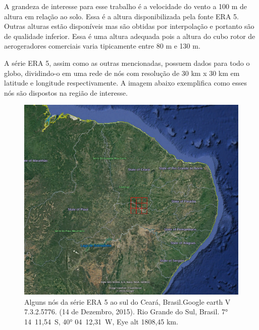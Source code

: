 \documentclass[
	12pt,				%
	openright,			%
	oneside,			%
	a4paper,			%
	english,			%
	french,				%
	spanish,			%
	brazil				%
	]{abntex2}
\begin{document}
A grandeza de interesse para esse trabalho é a velocidade do vento a 100 m de altura em relação ao solo. Essa é a altura disponibilizada pela fonte ERA 5. Outras alturas estão disponíveis mas são obtidas por interpolação e portanto são de qualidade inferior. Essa é uma altura adequada pois a altura do cubo rotor de aerogeradores comerciais varia tipicamente entre 80 m e 130 m. 


A série ERA 5, assim como as outras mencionadas, possuem dados para todo o globo, dividindo-o em uma rede de nós com resolução de 30 km x 30 km em latitude e longitude respectivamente. A imagem abaixo exemplifica como esses nós são dispostos na região de interesse. 


\begin{figure}[h]
    \centering
	\includegraphics[width=\textwidth]{era5nodes}
	\caption{Alguns nós da série ERA 5 ao sul do Ceará, Brasil.\newline Google earth V 7.3.2.5776. (14 de Dezembro, 2015). Rio Grande do Sul, Brasil.
\ang{7} 14\textquotesingle\ 11,54\textquotesingle\textquotesingle\ S, \ang{40} 04\textquotesingle\ 12,31\textquotesingle\textquotesingle\ W, Eye alt 1808,45 km.}
\end{figure}
\FloatBarrier
\end{document}
